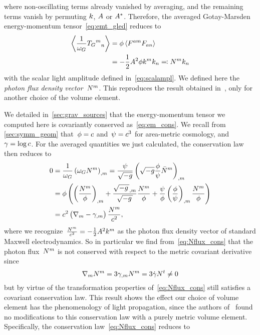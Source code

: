 where non-oscillating terms already vanished by averaging, and the remaining terms vanish by permuting $k$, $A$ or ${{A}^{*}}$. Therefore, the averaged Gotay-Marsden energy-momentum tensor~\eqref{eq:emt_gled} reduces to
\begin{align}
	\left<{\frac{1}{\omega_G}{{T_G}^m}_n}\right>&=\phi\left<{F^{am}F_{an}}\right>\\
	&=-\frac{1}{2}A^2\phi k^mk_n\eqqcolon N^mk_n
\end{align}
with the scalar light amplitude defined in~\eqref{eq:scalampl}. We defined here the \emph{photon flux density vector}~$N^m$. This reproduces the result obtained in~\autocite{EtheringtonNBiref}, only for another choice of the volume element.

We detailed in~\autoref{sec:grav_sources} that the energy-momentum tensor we computed here is covariantly conserved as~\eqref{eq:em_cons}. We recall from \autoref{sec:symm_geom} that~$\phi=c$ and~$\psi=c^3$ for area-metric cosmology, and~$\gamma=\log c$. For the averaged quantities we just calculated, the conservation law then reduces to
\begin{align}
	0&=\frac{1}{\omega_G}\left(\omega_GN^m\right)_{,m}
	=\frac{\psi}{\sqrt{-g}}\left(\sqrt{-g}\frac{\phi}{\psi}\bar{N}^m\right)_{,m}\\
	&=\phi\left(\left(\frac{N^m}{\phi}\right)_{,m}+\frac{\sqrt{-g\,}_{,m}}{\sqrt{-g\,}}\frac{N^m}{\phi}+\frac{\psi}{\phi}\left(\frac{\phi}{\psi}\right)_{,m}\frac{N^m}{\phi}\right)\\
	&=c^2\left(\nabla_m-\gamma_{,m}\right)\frac{N^m}{c^2}\label{eq:Nflux_cons}
	\mathpunct{,}
\end{align}
where we recognize~$\frac{N^m}{c^2}=-\frac{1}{2}A^2k^m$ as the photon flux density vector of standard Maxwell electrodynamics. So in particular we find from~\eqref{eq:Nflux_cons} that the photon flux~$N^m$ is not conserved with respect to the metric covariant derivative since
\begin{equation}\label{eq:Nflux_noncons}
	\nabla_mN^m=3\gamma_{,m}N^m=3\dot{\gamma}N^t\neq 0
\end{equation}
but by virtue of the transformation properties of~\eqref{eq:Nflux_cons} still satisfies a covariant conservation law. This result shows the effect our choice of volume element has the phenomenology of light propagation, since the authors of~\autocite{EtheringtonNBiref} found no modifications to this conservation law with a purely metric volume element. Specifically, the conservation law~\eqref{eq:Nflux_cons} reduces to
